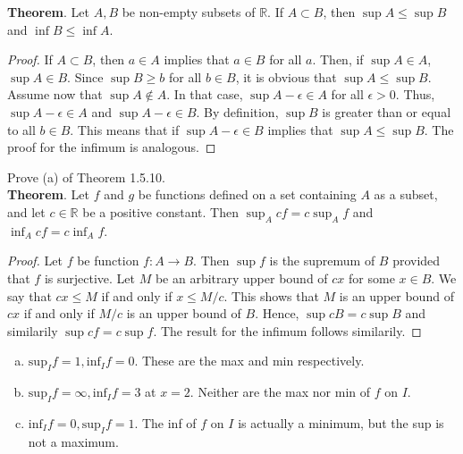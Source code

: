 \documentclass[12pt]{book}
\newenvironment{exercise}[2][Exercise]{\begin{trivlist}
\item[\hskip \labelsep {\bfseries #1}\hskip \labelsep {\bfseries #2.}]}{\end{trivlist}}
\begin{document}
\begin{exercise}{1.4.6}
\begin{exercise}{1.5.7}
\textbf{Theorem}. Let $A,B$ be non-empty subsets of $\mathbb{R}$. If $A \subset B$, then $\sup A \leq \sup B$ and $\inf B \leq \inf A$.
	\begin{proof}
	If $A \subset B$, then $a \in A$ implies that $a \in B$ for all $a$. Then, if $\sup A \in A$, $\sup A \in B$. Since $\sup B \geq b$ for all $b \in B$, it is obvious that $\sup A \leq \sup B$. Assume now that $\sup A \notin A$. In that case, $\sup A - \epsilon \in A$ for all $\epsilon > 0$. Thus, $\sup A - \epsilon \in A$ and $\sup A - \epsilon \in B$. By definition, $\sup B$ is greater than or equal to all $b \in B$. This means  that if $\sup A - \epsilon \in B$ implies that $\sup A \leq \sup B$. The proof for the infimum is analogous.
	\end{proof}
\end{exercise}

\begin{exercise}{1.5.10}
Prove (a) of Theorem 1.5.10. \\

\textbf{Theorem}. Let $f$ and $g$ be functions defined on a set containing $A$ as a subset, and let $c \in \mathbb{R}$ be a positive constant. Then $\sup_A c f= c \sup_A f$ and $\inf_A c f = c \inf_A f$.
	\begin{proof}
	Let $f$ be function $f: A \to B$. Then $\sup f$ is the supremum of $B$ provided that $f$ is surjective. Let $M$ be an arbitrary upper bound of $cx$ for some $x \in B$. We say that $c x \leq M$ if and only if $x \leq M/c$. This shows that $M$ is an upper bound of $c x$ if and only if $M/c$ is an upper bound of $B$. Hence, $\sup c B = c \sup B$ and similarily $\sup c f = c \sup f$. The result for the infimum follows similarily.
	\end{proof}
\end{exercise}

\begin{exercise}{1.5.8}
\begin{enumerate}[(a)]
\item $\mathrm{sup}_I f = 1, \mathrm{inf}_I f = 0$. These are the max and min respectively. 
\item $\mathrm{sup}_I f = \infty, \mathrm{inf}_I f = 3$ at $x = 2$. Neither are the max nor min of $f$ on $I$. 
\item $\mathrm{inf}_I f = 0, \mathrm{sup}_I f = 1$. The inf of $f$ on $I$ is actually a minimum, but the sup is not a maximum. 
\end{enumerate}


\end{exercise}


\end{exercise}
\end{document}

